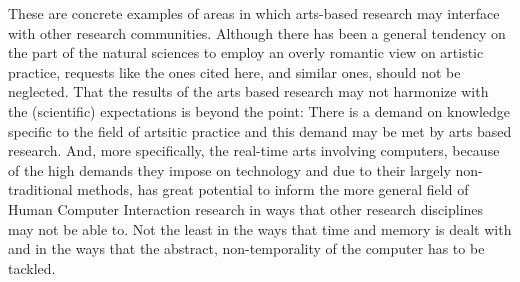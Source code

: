 These are concrete examples of areas in which arts-based research may interface with other research communities. Although there has been a general tendency on the part of the natural sciences to employ an overly romantic view on artistic practice, requests like the ones cited here, and similar ones, should not be neglected. That the results of the arts based research may not harmonize with the (scientific) expectations is beyond the point: There is a demand on knowledge specific to the field of artsitic practice and this demand may be met by arts based research. And, more specifically, the real-time arts involving computers, because of the high demands they impose on technology and due to their largely non-traditional methods, has great potential to inform the  more general field of Human Computer Interaction research in ways that other research disciplines may not be able to. Not the least in the ways that time and memory is dealt with and in the ways that the abstract, non-temporality of the computer has to be tackled. 












